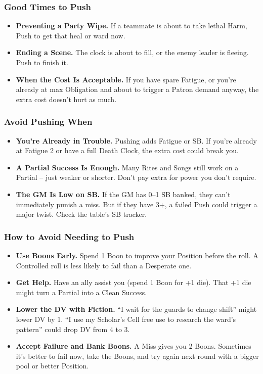 \subsubsection*{Good Times to Push}
\begin{itemize}
  \item \textbf{Preventing a Party Wipe.} If a teammate is about to take lethal Harm, Push to get that heal or ward now.
  \item \textbf{Ending a Scene.} The clock is about to fill, or the enemy leader is fleeing. Push to finish it.
  \item \textbf{When the Cost Is Acceptable.} If you have spare Fatigue, or you’re already at max Obligation and about to trigger a Patron demand anyway, the extra cost doesn’t hurt as much.
\end{itemize}

\subsubsection*{Avoid Pushing When}
\begin{itemize}
  \item \textbf{You’re Already in Trouble.} Pushing adds Fatigue or SB. If you’re already at Fatigue 2 or have a full Death Clock, the extra cost could break you.
  \item \textbf{A Partial Success Is Enough.} Many Rites and Songs still work on a Partial – just weaker or shorter. Don’t pay extra for power you don’t require.
  \item \textbf{The GM Is Low on SB.} If the GM has 0–1 SB banked, they can’t immediately punish a miss. But if they have 3+, a failed Push could trigger a major twist. Check the table’s SB tracker.
\end{itemize}

\subsubsection*{How to Avoid Needing to Push}
\begin{itemize}
  \item \textbf{Use Boons Early.} Spend 1 Boon to improve your Position before the roll. A Controlled roll is less likely to fail than a Desperate one.
  \item \textbf{Get Help.} Have an ally assist you (spend 1 Boon for +1 die). That +1 die might turn a Partial into a Clean Success.
  \item \textbf{Lower the DV with Fiction.} “I wait for the guards to change shift” might lower DV by 1. “I use my Scholar’s Cell free use to research the ward’s pattern” could drop DV from 4 to 3.
  \item \textbf{Accept Failure and Bank Boons.} A Miss gives you 2 Boons. Sometimes it’s better to fail now, take the Boons, and try again next round with a bigger pool or better Position.
\end{itemize}

